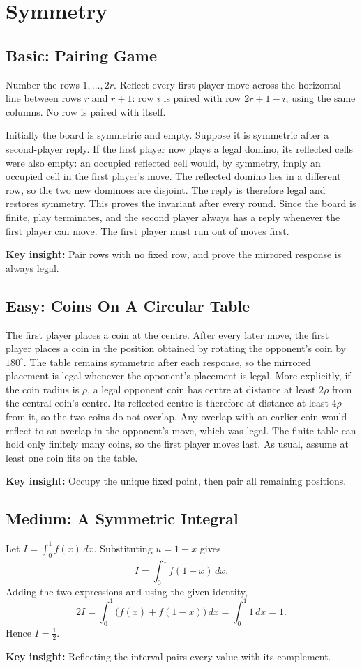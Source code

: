 \documentclass[12pt]{article}
\newcommand{\insight}[1]{\par\medskip\noindent\textbf{Key insight:} #1}
\begin{document}
\section{Symmetry}

\subsection*{Basic: Pairing Game}
Number the rows $1,\ldots,2r$. Reflect every first-player move across
the horizontal line between rows $r$ and $r+1$: row $i$ is paired with
row $2r+1-i$, using the same columns. No row is paired with itself.

Initially the board is symmetric and empty. Suppose it is symmetric
after a second-player reply. If the first player now plays a legal
domino, its reflected cells were also empty: an occupied reflected cell
would, by symmetry, imply an occupied cell in the first player's move.
The reflected domino lies in a different row, so the two new dominoes
are disjoint. The reply is therefore legal and restores symmetry.
This proves the invariant after every round. Since the board is finite,
play terminates, and the second player always has a reply whenever the
first player can move. The first player must run out of moves first.
\insight{Pair rows with no fixed row, and prove the mirrored response is always legal.}

\subsection*{Easy: Coins On A Circular Table}
The first player places a coin at the centre. After every later move,
the first player places a coin in the position obtained by rotating
the opponent's coin by $180^\circ$. The table remains symmetric after
each response, so the mirrored placement is legal whenever the
opponent's placement is legal. More explicitly, if the coin radius is
$\rho$, a legal opponent coin has centre at distance at least $2\rho$
from the central coin's centre. Its reflected centre is therefore at
distance at least $4\rho$ from it, so the two coins do not overlap.
Any overlap with an earlier coin would reflect to an overlap in the
opponent's move, which was legal. The finite table can hold only finitely
many coins, so the first player moves last. As usual, assume at least
one coin fits on the table.
\insight{Occupy the unique fixed point, then pair all remaining positions.}

\subsection*{Medium: A Symmetric Integral}
Let $I=\int_0^1f(x)\,dx$. Substituting $u=1-x$ gives
\[
I=\int_0^1f(1-x)\,dx.
\]
Adding the two expressions and using the given identity,
\[
2I=\int_0^1\bigl(f(x)+f(1-x)\bigr)\,dx=\int_0^1 1\,dx=1.
\]
Hence $I=\tfrac12$.
\insight{Reflecting the interval pairs every value with its complement.}
\end{document}
